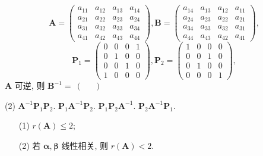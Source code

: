 \[ \bm{A} = \begin{pmatrix} a_{11} & a_{12} & a_{13} & a_{14} \\ a_{21} & a_{22} & a_{23} & a_{24} \\ a_{31} & a_{32} & a_{33} & a_{34} \\ a_{41} & a_{42} & a_{43} & a_{44} \end{pmatrix}, \bm{B} = \begin{pmatrix} a_{14} & a_{13} & a_{12} & a_{11} \\ a_{24} & a_{23} & a_{22} & a_{21} \\ a_{34} & a_{33} & a_{32} & a_{31} \\ a_{44} & a_{43} & a_{42} & a_{41} \end{pmatrix}, \]
\[ \bm{P}_1 = \begin{pmatrix} 0 & 0 & 0 & 1 \\ 0 & 1 & 0 & 0 \\ 0 & 0 & 1 & 0 \\ 1 & 0 & 0 & 0 \end{pmatrix}, \bm{P}_2 = \begin{pmatrix} 1 & 0 & 0 & 0 \\ 0 & 0 & 1 & 0 \\ 0 & 1 & 0 & 0 \\ 0 & 0 & 0 & 1 \end{pmatrix}, \]
$\displaystyle \bm{A}$ 可逆, 则 $\displaystyle \bm{B}^{-1} =~(~\quad~)$
\begin{tasks}(2)
  \task $\displaystyle \bm{A}^{-1}\bm{P}_1\bm{P}_2.$
  \task $\displaystyle \bm{P}_1\bm{A}^{-1}\bm{P}_2.$
  \task $\displaystyle \bm{P}_1\bm{P}_2\bm{A}^{-1}.$
  \task $\displaystyle \bm{P}_2\bm{A}^{-1}\bm{P}_1.$
\end{tasks}

\vspace{9em}

\begin{enumerate}
\item[(1)] $\displaystyle r(\bm{A}) \le 2$;
\item[(2)] 若 $\displaystyle \boldsymbol{\alpha}, \boldsymbol{\beta}$ 线性相关, 则 $\displaystyle r(\bm{A}) < 2$.
\end{enumerate}
